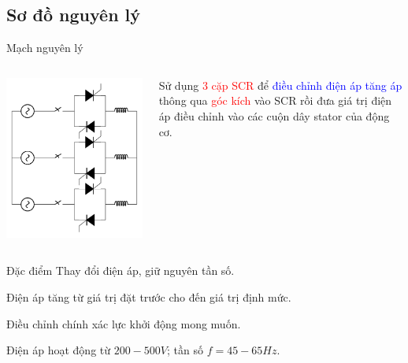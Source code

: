 \documentclass{beamer}
\begin{document}
\subsection*{Sơ đồ nguyên lý}
\begin{frame}{Mạch nguyên lý}
	\vspace{-1.2cm}
	\begin{columns}
		\begin{center}
			\includegraphics[scale=.45,angle=-90]{../sodomach/khoidongmem.pdf} 
		\end{center}
		
		\justifying
		Sử dụng \textcolor{red}{3 cặp SCR} để \textcolor{blue}{điều chỉnh điện áp} \textcolor{blue}{tăng áp} thông qua \textcolor{red}{góc kích} vào SCR rồi đưa giá trị điện áp điều chỉnh vào các cuộn dây stator của động cơ.
	\end{columns}
	\begin{block}{Đặc điểm}
		\justifying
		Thay đổi điện áp, giữ nguyên tần số.
		
		\begin{list}{--}{}
			\item Điện áp tăng từ giá trị đặt trước cho đến giá trị định mức.
			\item Điều chỉnh chính xác lực khởi động mong muốn.
			\item Điện áp hoạt động từ $200-500V$; tần số $f = 45-65Hz$.
		\end{list}
	\end{block}
\end{frame}
\end{document}

